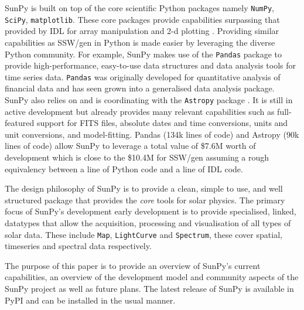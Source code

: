 SunPy is built on top of the core scientific Python packages namely 
\texttt{NumPy}, \texttt{SciPy}, \texttt{matplotlib}. These core 
packages provide capabilities surpassing that provided by IDL for 
array manipulation and 2-d plotting \cite{greenfield2011}. Providing 
similar capabilities as SSW/gen in Python is made easier by 
leveraging the diverse Python community. For example, SunPy makes use 
of the \texttt{Pandas} package to provide high-performance, 
easy-to-use data structures and data analysis tools for time series 
data\cite{mckinney2012}. \texttt{Pandas} was originally developed for 
quantitative analysis of financial data and has seen grown into a 
generalised data analysis package. SunPy also relies on and is 
coordinating with the \texttt{Astropy} package 
\cite{theastropycollaboration2013}. It is still in active development 
but already provides many relevant capabilities such as full-featured
support for FITS files, absolute dates and time conversions, units 
and unit conversions, and model-fitting. Pandas (134k lines of code) 
and Astropy (90k lines of code) allow SunPy to leverage a total value 
of \$7.6M worth of development which is close to the \$10.4M for 
SSW/gen assuming a rough equivalency between a line of Python code 
and a line of IDL code. 

The design philosophy of SunPy is to provide a clean, simple to use, 
and well structured package that provides the \textit{core} tools for 
solar physics. The primary focus of SunPy's development early 
development is to provide specialised, linked, datatypes that allow 
the acquisition, processing and visualisation of all types of solar data. 
These include \texttt{Map}, \texttt{LightCurve} and 
\texttt{Spectrum}, these cover spatial, timeseries and spectral data  
respectively. 

The purpose of this paper is to provide an overview of SunPy's 
current capabilities, an overview of the development model and 
community aspects of the SunPy project as well as future plans. The 
latest release of SunPy is available in PyPI and can be installed in 
the usual manner.
